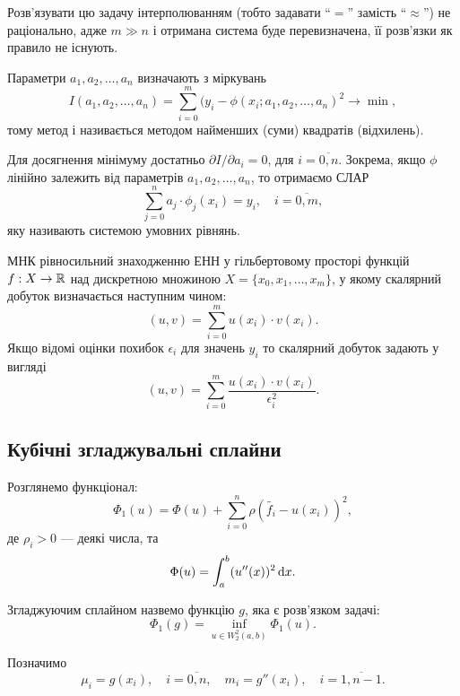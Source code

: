 Розв'язувати цю задачу інтерполюванням (тобто задавати ``$=$'' замість ``$\approx$'') не раціонально, адже $m \gg n$ і отримана система буде перевизначена, її розв'язки як правило не існують. \medskip

Параметри $a_1, a_2, \ldots, a_n$ визначають з міркувань \[I(a_1, a_2, \ldots, a_n) = \sum_{i = 0}^m (y_i - \phi(x_i; a_1, a_2, \ldots, a_n)^2 \to \min,\] тому метод і називається методом найменших (суми) квадратів (відхилень). \medskip

Для досягнення мінімуму достатньо $\partial I / \partial a_i = 0$, для $i = \overline{0, n}$. Зокрема, якщо $\phi$ лінійно залежить від параметрів $a_1, a_2, \ldots, a_n$, то отримаємо СЛАР \[ \sum_{j = 0}^n a_j \cdot \phi_j(x_i) = y_i, \quad i = \overline{0, m},\] яку називають системою умовних рівнянь. \medskip

МНК рівносильний знаходженню ЕНН у гільбертовому просторі функцій $f: X \to \mathbb{R}$ над дискретною множиною $X = \{x_0, x_1, \ldots, x_m\}$, у якому скалярний добуток визначається наступним чином: \[ (u, v) = \sum_{i = 0}^m u(x_i) \cdot v(x_i). \] Якщо відомі оцінки похибок $\epsilon_i$ для значень $y_i$ то скалярний добуток задають у вигляді \[ (u, v) = \sum_{i = 0}^m \frac{u(x_i) \cdot v(x_i)}{\epsilon_i^2}. \]

\subsection{Кубічні згладжувальні сплайни}

Розглянемо функціонал: \[ \Phi_1(u) = \Phi(u) + \sum_{i = 0}^n \rho \left( \tilde{f_i} - u(x_i) \right)^2,\] де $\rho_i > 0$ --- деякі числа, та \[\Phi(u) = \int_a^b (u''(x))^2 \mathop{}\!\mathrm{d} x.\]

Згладжуючим сплайном назвемо функцію $g$, яка є розв'язком задачі: \[ \Phi_1(g) = \inf_{u \in W_2^2(a, b)} \Phi_1(u).\]

Позначимо \[ \mu_i = g(x_i), \quad i = \overline{0, n}, \quad m_i = g''(x_i), \quad i = \overline{1, n - 1}.\]

